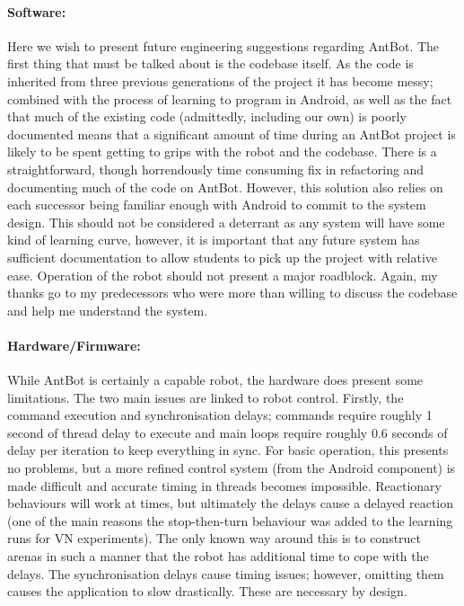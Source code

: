 \documentclass[a4paper,11pt,twoside,openright]{article}
\begin{document}
\paragraph{Software:}
Here we wish to present future engineering suggestions regarding AntBot. The first thing that must be talked
about is the codebase itself. As the code is inherited from three previous generations of the project it has
become messy; combined with the process of learning to program in Android, as well as the fact that
much of the existing code (admittedly, including our own) is poorly documented means that a significant
amount of time during an AntBot project is likely to be spent getting to grips with the robot and the codebase. There
is a straightforward, though horrendously time consuming fix in refactoring and documenting much of the code on
AntBot. However, this solution also relies on each successor being familiar enough with Android to commit to 
the system design. This should not be considered a deterrant as any system will have some kind of learning curve,
however, it is important that any future system has sufficient documentation to allow students to pick up
the project with relative ease. Operation of the robot should not present a major roadblock. Again, my thanks
go to my predecessors who were more than willing to discuss the codebase and help me understand the system.
\newline

\paragraph{Hardware/Firmware:}
While AntBot is certainly a capable robot, the hardware does present some limitations. The two main issues
are linked to robot control. Firstly, the command execution and synchronisation delays; commands require roughly
1 second of thread delay to execute and main loops require roughly 0.6 seconds of delay per iteration to keep
everything in sync. For basic operation, this presents no problems, but a more refined control system (from the Android component)
is made difficult and accurate timing in threads becomes impossible. Reactionary
behaviours will work at times, but ultimately the delays cause a delayed reaction (one of the main reasons the
stop-then-turn behaviour was added to the learning runs for VN experiments). The only known way around this
is to construct arenas in such a manner that the robot has additional time to cope with the delays. The
synchronisation delays cause timing issues; however, omitting them causes the application to slow drastically.
These are necessary by design.
\newline
\end{document}
